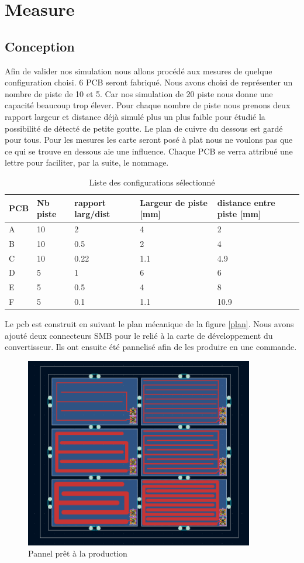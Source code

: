 \graphicspath{ {./figuresMeasure} }
\section{Measure}

\subsection{Conception}
Afin de valider nos simulation nous allons procédé aux mesures de quelque configuration choisi. 6 PCB seront fabriqué. Nous avons choisi de représenter un nombre de piste de 10 et 5. Car nos simulation de 20 piste nous donne une capacité beaucoup trop élever. Pour chaque nombre de piste nous prenons deux rapport largeur et distance déjà simulé plus un plus faible pour étudié la possibilité de détecté de petite goutte. Le plan de cuivre du dessous est gardé pour tous. Pour les mesures les carte seront posé à plat nous ne voulons pas que ce qui se trouve en dessous aie une influence. Chaque PCB se verra attribué une lettre pour faciliter, par la suite, le nommage.

\begin{table}[!ht]
\begin{center}
\begin{tabular}[c]{lllll}
PCB & Nb piste & rapport larg/dist & Largeur de piste [mm] & distance entre piste [mm] \\
\hline
A & 10 & 2 & 4 & 2\\
B & 10 & 0.5 & 2 & 4\\
C & 10 & 0.22 & 1.1 & 4.9\\
D & 5 & 1 & 6 & 6\\
E & 5 & 0.5 & 4 & 8\\
F & 5 & 0.1 & 1.1 & 10.9
\end{tabular}
\caption{Liste des configurations sélectionné }
\end{center}
\end{table}

Le pcb est construit en suivant le plan mécanique de la figure \ref{plan}. Nous avons ajouté deux connecteurs SMB pour le relié à la carte de développement du convertisseur. Ils ont ensuite été pannelisé afin de les produire en une commande.

\begin{figure}[!ht]
\centering
 \includegraphics[width=10cm]{pannel.png}
 \caption{Pannel prêt à la production}
\end{figure}

